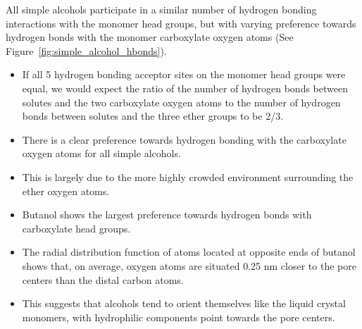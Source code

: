 \documentclass{article}
\begin{document}
  All simple alcohols participate in a similar number of hydrogen bonding interactions
  with the monomer head groups, but with varying preference towards hydrogen bonds with
  the monomer carboxylate oxygen atoms (See Figure~\ref{fig:simple_alcohol_hbonds}).
  \begin{itemize}
  	\item If all 5 hydrogen bonding acceptor sites on the monomer head groups were equal,
  	we would expect the ratio of the number of hydrogen bonds between solutes and the two 
  	carboxylate oxygen atoms to the number of hydrogen bonds between solutes and the three
  	ether groups to be 2/3. 
  	\item There is a clear preference towards hydrogen bonding with the carboxylate 
  	oxygen atoms for all simple alcohols.
  	\item This is largely due to the more highly crowded environment surrounding the ether
  	oxygen atoms.
  	\item Butanol shows the largest preference towards hydrogen bonds with carboxylate 
  	head groups.
  	\item The radial distribution function of atoms located at opposite ends of butanol
  	shows that, on average, oxygen atoms are situated 0.25 nm closer to the pore centers
  	than the distal carbon atoms.
  	\item This suggests that alcohols tend to orient themselves like the liquid crystal 
  	monomers, with hydrophilic components point towards the pore centers.
  \end{itemize}
  
\end{document}
